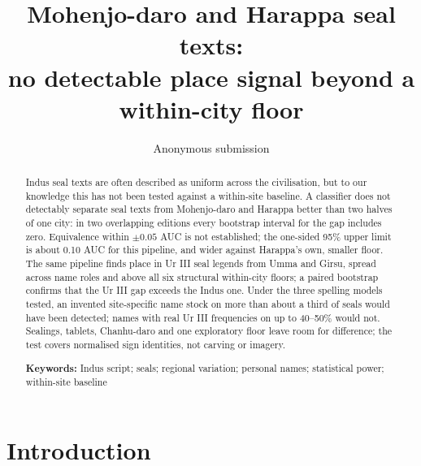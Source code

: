 \documentclass[11pt,a4paper]{article}
\title{\textbf{Mohenjo-daro and Harappa seal texts:\\no detectable place signal beyond a within-city floor}}
\author{Anonymous submission}
\date{}
\begin{document}
\maketitle

\begin{abstract}
\noindent Indus seal texts are often described as uniform across the civilisation, but to our knowledge this has not been tested against a within-site baseline. %
A classifier does not detectably separate seal texts from Mohenjo-daro and Harappa better than two halves of one city: in two overlapping editions every bootstrap interval for the gap includes zero. %
Equivalence within $\pm 0.05$ AUC is not established; the one-sided 95\% upper limit is about 0.10 AUC for this pipeline, and wider against Harappa's own, smaller floor. %
The same pipeline finds place in Ur III seal legends from Umma and Girsu, spread across name roles and above all six structural within-city floors; a paired bootstrap confirms that the Ur III gap exceeds the Indus one. %
Under the three spelling models tested, an invented site-specific name stock on more than about a third of seals would have been detected; names with real Ur III frequencies on up to 40--50\% would not. %
Sealings, tablets, Chanhu-daro and one exploratory floor leave room for difference; the test covers normalised sign identities, not carving or imagery.

\medskip
\noindent\textbf{Keywords:} Indus script; seals; regional variation; personal names; statistical power; within-site baseline
\end{abstract}

\section{Introduction}
\label{sec:intro}
\end{document}
